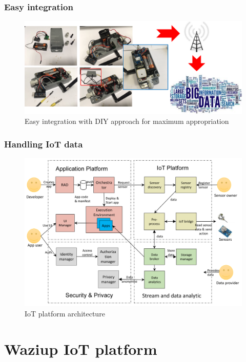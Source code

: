 \documentclass{beamer}
\begin{document}
\begin{frame}
\frametitle{Easy integration}

  \begin{figure}[H] 
  \centering  
  \includegraphics[width=.8\linewidth]{figures/easy-integration}   
  \caption{Easy integration with DIY approach for maximum appropriation}   
  \label{figure-easy-integration}  
  \end{figure} 

\end{frame}

\begin{frame}
\frametitle{Handling IoT data}

  \begin{figure} 
  \centering  
  \includegraphics[width=.9\linewidth]{figures/GlobalArch}   
  \caption{IoT platform architecture}   
  \label{figure-globalarch}  
  \end{figure} 
  
\end{frame}

\section{Waziup IoT platform}
\end{document}
